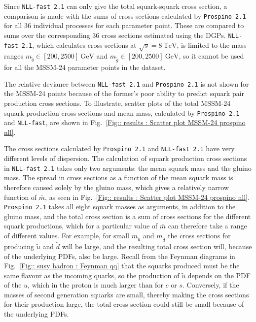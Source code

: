\documentclass[twoside,english]{uiofysmaster}
\begin{document}
{{Since \verb|NLL-fast 2.1| can only give the total squark-squark cross section, a comparison is made with the sums of cross sections calculated by \verb|Prospino 2.1| for all 36 individual processes for each parameter point. These are compared to sums over the corresponding 36 cross sections estimated using the DGPs. \verb|NLL-fast 2.1|, which calculates cross sections at $\sqrt{s}=8~\mathrm{TeV}$, is limited to the mass ranges $m_{\widetilde{q}} \in [200, 2500]~\mathrm{GeV}$ and $m_{\widetilde{g}} \in [200, 2500]~\mathrm{GeV}$, so it cannot be used for all the MSSM-24 parameter points in the dataset.

The relative deviance between \verb|NLL-fast 2.1| and \verb|Prospino 2.1| is not shown for the MSSM-24 points because of the former's poor ability to predict squark pair production cross sections. To illustrate, scatter plots of the total MSSM-24 squark production cross sections and mean mass, calculated by \verb|Prospino 2.1| and \verb|NLL-fast|, are shown in Fig.~\ref{Fig:: results : Scatter plot MSSM-24 prospino nll}. 

The cross sections calculated by \verb|Prospino 2.1| and \verb|NLL-fast 2.1| have very different levels of dispersion. The calculation of squark production cross sections in \verb|NLL-fast 2.1| takes only two arguments: the mean squark mass and the gluino mass. The spread in cross sections as a function of the mean squark mass is therefore caused solely by the gluino mass, which gives a relatively narrow function of $\bar{m}$, as seen in Fig.~\ref{Fig:: results : Scatter plot MSSM-24 prospino nll}. \verb|Prospino 2.1| takes all eight squark masses as arguments, in addition to the gluino mass, and the total cross section is a sum of cross sections for the different squark productions, which for a particular value of $\bar{m}$ can therefore take a range of different values. For example, for small $m_{\widetilde{u}}$ and $m_{\widetilde{d}}$ the cross sections for producing $\widetilde{u}$ and $\widetilde{d}$ will be large, and the resulting total cross section will, because of the underlying PDFs, also be large. Recall from the Feynman diagrams in Fig.~\ref{Fig:: susy hadron : Feynman qq} that the squarks produced must be the same flavour as the incoming quarks, so the production of $\widetilde{u}$ depends on the PDF of the $u$, which in the proton is much larger than for $c$ or $s$. Conversely, if the masses of second generation squarks are small, thereby making the cross sections for their production large, the total cross section could still be small because of the underlying PDFs.

}}
\end{document}
